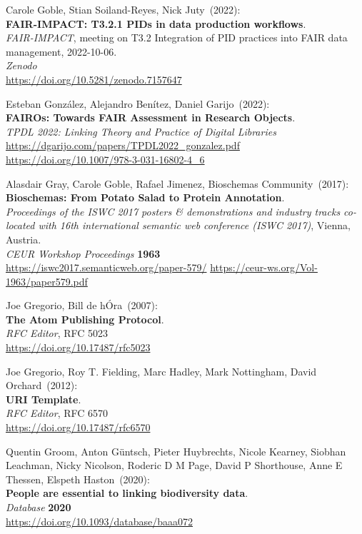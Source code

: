 \begin{thebibliography}{9}
Carole Goble, Stian Soiland-Reyes, Nick Juty~(2022): \\
\textbf{FAIR-IMPACT: T3.2.1 PIDs in data production workflows}.\\
\emph{FAIR-IMPACT}, meeting on T3.2 Integration of PID practices into FAIR data management, 2022-10-06.\\
\emph{Zenodo}\\
\url{https://doi.org/10.5281/zenodo.7157647}

Esteban González, Alejandro Benítez, Daniel Garijo~(2022): \\
\textbf{FAIROs: Towards FAIR Assessment in Research Objects}.\\
\emph{TPDL 2022: Linking Theory and Practice of Digital Libraries}\\
\url{https://dgarijo.com/papers/TPDL2022_gonzalez.pdf}\\
\url{https://doi.org/10.1007/978-3-031-16802-4_6}

Alasdair Gray, Carole Goble, Rafael Jimenez, Bioschemas
Community~(2017): \\
\textbf{Bioschemas: From Potato Salad to Protein Annotation}.\\
\emph{Proceedings of the ISWC 2017 posters \& demonstrations and
industry tracks co-located with 16th international semantic web
conference (ISWC 2017)}, Vienna, Austria.\\
\emph{CEUR Workshop Proceedings} \textbf{1963} \\
\url{https://iswc2017.semanticweb.org/paper-579/}
\url{https://ceur-ws.org/Vol-1963/paper579.pdf}

Joe Gregorio, Bill de hÓra~(2007): \\
\textbf{The {Atom Publishing Protocol}}.\\
\emph{RFC Editor}, RFC 5023\\
\url{https://doi.org/10.17487/rfc5023}

Joe Gregorio, Roy T. Fielding, Marc Hadley, Mark Nottingham, David Orchard~(2012): \\
\textbf{{URI Template}}.\\
\emph{RFC Editor}, RFC 6570 \\
\url{https://doi.org/10.17487/rfc6570}

Quentin Groom, Anton Güntsch, Pieter Huybrechts, Nicole Kearney, Siobhan Leachman, Nicky Nicolson, Roderic D M Page, David P Shorthouse, Anne E Thessen, Elspeth Haston~(2020): \\
\textbf{People are essential to linking biodiversity data}.\\
\emph{Database} \textbf{2020}\\
\url{https://doi.org/10.1093/database/baaa072}


\end{thebibliography}
